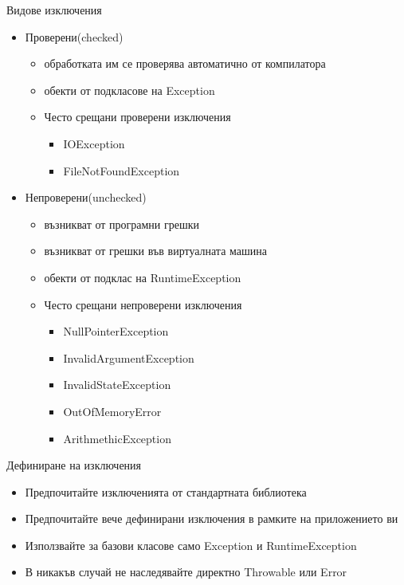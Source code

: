 \documentclass{beamer}
\begin{document}
\begin{frame}{Видове изключения}
  \transdissolve
  \begin{itemize}
  \item Проверени(checked) \pause
    \begin{itemize}
      \item обработката им се проверява автоматично от компилатора \pause
      \item обекти от подкласове на Exception \pause
      \item Често срещани проверени изключения \pause
        \begin{itemize}
          \item IOException \pause
          \item FileNotFoundException \pause
        \end{itemize}
    \end{itemize}

  \item Непроверени(unchecked) \pause
    \begin{itemize}
      \item възникват от програмни грешки \pause
      \item възникват от грешки във виртуалната машина \pause
      \item обекти от подклас на RuntimeException \pause
      \item Често срещани непроверени изключения
        \begin{itemize}
          \item NullPointerException
          \item InvalidArgumentException
          \item InvalidStateException
          \item OutOfMemoryError
          \item ArithmethicException
        \end{itemize}

    \end{itemize}

  \end{itemize}
\end{frame}

\begin{frame}{Дефиниране на изключения}
  \transdissolve
  \begin{itemize}
  \item Предпочитайте изключенията от стандартната библиотека \pause
  \item Предпочитайте вече дефинирани изключения в рамките на
    приложението ви \pause
  \item Използвайте за базови класове само Exception и
    RuntimeException \pause
  \item В никакъв случай не наследявайте директно Throwable или Error
  \end{itemize}
\end{frame}
\end{document}
